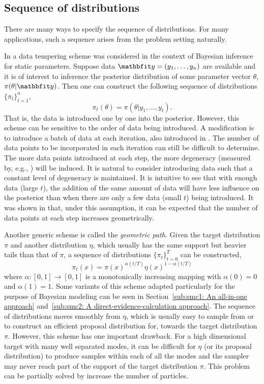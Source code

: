 \subsection{Sequence of distributions}
\label{sub:Sequence of distributions}

There are many ways to specify the sequence of distributions. For many applications, such a sequence arises from the problem setting naturally.

In \cite{Chopin:2002hg} a data tempering scheme was considered in the context of Bayesian inference for static parameters. Suppose data $\data = (y_1,\dots,y_n)$ are available and it is of interest to inference the posterior distribution of some parameter vector $\theta$, $\pi(\theta|\data)$. Then one can construct the following sequence of distributions $\{\pi_t\}_{t=1}^n$,
\begin{equation}
  \pi_t(\theta) = \pi(\theta|y_1,\dots,y_t).
\end{equation}
That is, the data is introduced one by one into the posterior. However, this scheme can be sensitive to the order of data being introduced. A modification is to introduce a batch of data at each iteration, also introduced in \cite{Chopin:2002hg}. The number of data points to be incorporated in each iteration can still be difficult to determine. The more data points introduced at each step, the more degeneracy (measured by, e.g., \ess) will be induced. It is natural to consider introducing data such that a constant level of degeneracy is maintained. It is intuitive to see that with enough data (large $t$), the addition of the same amount of data will have less influence on the posterior than when there are only a few data (small $t$) being introduced. It was shown in \cite{Chopin:2002hg} that, under this assumption, it can be expected that the number of data points at each step increases geometrically.

Another generic scheme is called the \emph{geometric path}. Given the target distribution $\pi$ and another distribution $\eta$, which usually has the same support but heavier tails than that of $\pi$, a sequence of distributions $\{\pi_t\}_{t=0}^T$ can be constructed,
\begin{equation}
  \pi_t(x) = \pi(x)^{\alpha(t/T)}\eta(x)^{1-\alpha(t/T)}
\end{equation}
where $\alpha:[0,1]\to[0,1]$ is a monotonically increasing mapping with $\alpha(0) = 0$ and $\alpha(1) = 1$. Some variants of this scheme adapted particularly for the purpose of Bayesian modeling can be seen in Section~\ref{sub:smc1: An all-in-one approach} and~\ref{sub:smc2: A direct-evidence-calculation approach}. The sequence of distributions moves smoothly from $\eta$, which is usually easy to sample from or to construct an efficient proposal distribution for, towards the target distribution $\pi$. However, this scheme has one important drawback. For a high dimensional target with many well separated modes, it can be difficult for $\eta$ (or its proposal distribution) to produce samples within each of all the modes and the sampler may never reach part of the support of the target distribution $\pi$. This problem can be partially solved by increase the number of particles.

